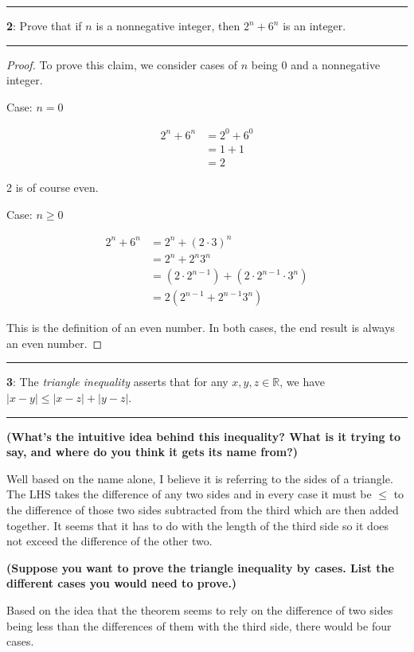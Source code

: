 \documentclass[11pt]{article}
\newcommand\question[2]{\vspace{.25in}\hrule\textbf{#1}: #2\vspace{.5em}\hrule\vspace{.10in}}
\renewcommand\part[1]{\vspace{.10in}\textbf{(#1)}\par}
\newcommand{\R}{\mathbb{R}}
\begin{document}
\question{2}{Prove that if $n$ is a nonnegative integer, then $2^n + 6^n$ is an integer.}

\begin{proof}
	To prove this claim, we consider cases of $n$ being 0 and a nonnegative integer.

	Case: $n = 0$

	\begin{align*}
		2^n + 6^n &= 2^0 + 6^0\\
		&= 1 + 1\\
		&= 2
	\end{align*}

	2 is of course even.

	Case: $n \ge 0$

	\begin{align*}
		2^n + 6^n &= 2^n + (2 \cdot 3)^n\\
		&= 2^n + 2^n3^n\\
		&= (2 \cdot 2^{n-1}) + (2 \cdot 2^{n-1} \cdot 3^n)\\
		&= 2(2^{n-1} + 2^{n-1}3^n)
	\end{align*}

	This is the definition of an even number. In both cases, the end result is always an even number.
\end{proof}

\question{3}{The \textit{triangle inequality} asserts that for any $x, y, z \in \R$, we have $|x-y| \le |x-z| + |y-z|$.}

\part{What's the intuitive idea behind this inequality? What is it trying to say, and where do you think it gets its name from?}

Well based on the name alone, I believe it is referring to the sides of a triangle. The LHS takes the difference of any two sides and in every case it must be $\le$ to the difference of those two sides subtracted from the third which are then added together. It seems that it has to do with the length of the third side so it does not exceed the difference of the other two.

\part{Suppose you want to prove the triangle inequality by cases. List the different cases you would need to prove.}

Based on the idea that the theorem seems to rely on the difference of two sides being less than the differences of them with the third side, there would be four cases.
\end{document}

